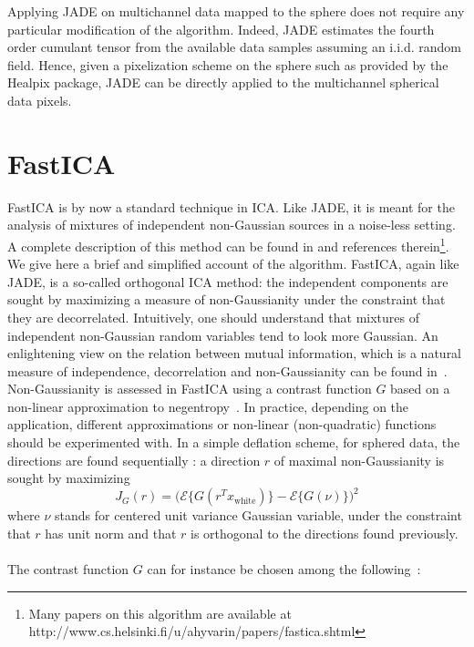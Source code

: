 Applying JADE on multichannel data mapped to the sphere does not require any particular modification of the algorithm. Indeed, JADE estimates 
the fourth order cumulant tensor from the available data samples assuming an i.i.d. random field. Hence, given a pixelization scheme on 
the sphere such as provided by the Healpix package, JADE can be directly applied to the multichannel spherical data pixels.


\section{FastICA}

FastICA is by now a standard technique in ICA. Like JADE, it is meant for the analysis of mixtures of independent non-Gaussian sources in 
a noise-less setting. A complete description of this method can be found in \citep{ica:icabook} and references therein\footnote{Many papers on this 
algorithm are available at http://www.cs.helsinki.fi/u/ahyvarin/papers/fastica.shtml}. We give here a brief and simplified account 
of the algorithm. FastICA, again like JADE, is a so-called orthogonal ICA method: the independent components are sought by maximizing a 
measure of non-Gaussianity under the constraint that they are decorrelated. Intuitively, one should understand that mixtures of independent 
non-Gaussian random variables tend to look more Gaussian. An enlightening view on the relation between mutual information, which is 
a natural measure of independence, decorrelation and non-Gaussianity can be found in~\citep{ica:3easy,ica:geomindep}. Non-Gaussianity is assessed 
in FastICA using a contrast function $G$ based on a non-linear approximation to negentropy~\citep{ica:icabook}. In practice, depending 
on the application, different approximations or non-linear (non-quadratic) functions should be experimented with. In a simple deflation scheme, 
for sphered data, the directions are found sequentially : a direction $r$ of maximal non-Gaussianity is sought by maximizing
\begin{equation}
J_G(r) = \Big( \mathcal{E} \{ G(r^T x_{\textrm{white}}  ) \} - \mathcal{E} \{ G(\nu ) \} \Big)^2 
\end{equation}
where $\nu$ stands for centered unit variance Gaussian variable, under the constraint that $r$ has unit norm and that $r$ is orthogonal 
to the directions found previously.\\ \\
The contrast function $G$ can for instance be chosen among the following~\citep{ica:icabook}:
